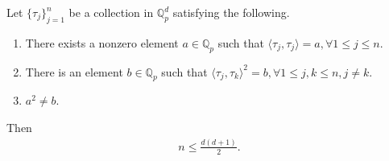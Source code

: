 \documentclass[10pt,a4paper]{amsart}
\begin{document}
\begin{theorem}	\label{PGERZON}
	Let $\{\tau_j\}_{j=1}^n$ be a collection in $\mathbb{Q}^d_p$  satisfying the following.
	\begin{enumerate}[\upshape(i)]
		\item There exists a nonzero element  $a \in \mathbb{Q}_p$ such that  $\langle \tau_j, \tau_j\rangle =a,  \forall 1\leq j \leq n$.
		\item There is an element  $b \in \mathbb{Q}_p$ such that $\langle \tau_j, \tau_k\rangle^2 =b, \forall  1\leq j,k \leq n, j\neq k.$
		\item $a^2\neq b$. 
	\end{enumerate}
	Then 
	\begin{align*}
		n \leq  \frac{d(d+1)}{2}.	
	\end{align*}
\end{theorem}
\end{document}
